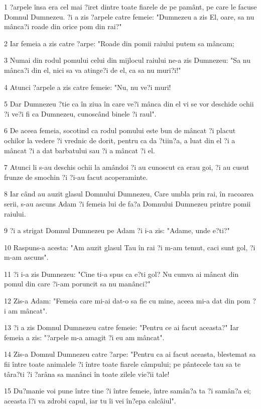\par 1 ?arpele însa era cel mai ?iret dintre toate fiarele de pe pamânt, pe care le facuse Domnul Dumnezeu. ?i a zis ?arpele catre femeie: "Dumnezeu a zis El, oare, sa nu mânca?i roade din orice pom din rai?"
\par 2 Iar femeia a zis catre ?arpe: "Roade din pomii raiului putem sa mâncam;
\par 3 Numai din rodul pomului celui din mijlocul raiului ne-a zis Dumnezeu: "Sa nu mânca?i din el, nici sa va atinge?i de el, ca sa nu muri?i!"
\par 4 Atunci ?arpele a zis catre femeie: "Nu, nu ve?i muri!
\par 5 Dar Dumnezeu ?tie ca în ziua în care ve?i mânca din el vi se vor deschide ochii ?i ve?i fi ca Dumnezeu, cunoscând binele ?i raul".
\par 6 De aceea femeia, socotind ca rodul pomului este bun de mâncat ?i placut ochilor la vedere ?i vrednic de dorit, pentru ca da ?tiin?a, a luat din el ?i a mâncat ?i a dat barbatului sau ?i a mâncat ?i el.
\par 7 Atunci li s-au deschis ochii la amândoi ?i au cunoscut ca erau goi, ?i au cusut frunze de smochin ?i ?i-au facut acoperaminte.
\par 8 Iar când au auzit glasul Domnului Dumnezeu, Care umbla prin rai, în racoarea serii, s-au ascuns Adam ?i femeia lui de fa?a Domnului Dumnezeu printre pomii raiului.
\par 9 ?i a strigat Domnul Dumnezeu pe Adam ?i i-a zis: "Adame, unde e?ti?"
\par 10 Raspuns-a acesta: "Am auzit glasul Tau în rai ?i m-am temut, caci sunt gol, ?i m-am ascuns".
\par 11 ?i i-a zis Dumnezeu: "Cine ti-a spus ca e?ti gol? Nu cumva ai mâncat din pomul din care ?i-am poruncit sa nu manânci?"
\par 12 Zis-a Adam: "Femeia care mi-ai dat-o sa fie cu mine, aceea mi-a dat din pom ?i am mâncat".
\par 13 ?i a zis Domnul Dumnezeu catre femeie: "Pentru ce ai facut aceasta?" Iar femeia a zis: "?arpele m-a amagit ?i eu am mâncat".
\par 14 Zis-a Domnul Dumnezeu catre ?arpe: "Pentru ca ai facut aceasta, blestemat sa fii între toate animalele ?i între toate fiarele câmpului; pe pântecele tau sa te târa?ti ?i ?arâna sa manânci în toate zilele vie?ii tale!
\par 15 Du?manie voi pune între tine ?i între femeie, între samân?a ta ?i samân?a ei; aceasta î?i va zdrobi capul, iar tu îi vei în?epa calcâiul".
